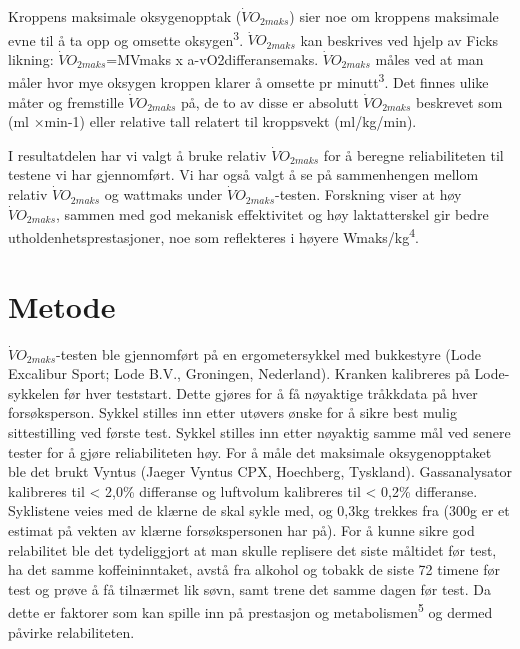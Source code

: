 \documentclass[
  letterpaper,
  DIV=11,
  numbers=noendperiod]{scrreprt}
\begin{document}
Kroppens maksimale oksygenopptak (\(\dot{V}O_{2maks}\)) sier noe om
kroppens maksimale evne til å ta opp og omsette
oksygen\textsuperscript{3}. \(\dot{V}O_{2maks}\) kan beskrives ved hjelp
av Ficks likning: \(\dot{V}O_{2maks}\)=MVmaks x a-vO2differansemaks.
\(\dot{V}O_{2maks}\) måles ved at man måler hvor mye oksygen kroppen
klarer å omsette pr minutt\textsuperscript{3}. Det finnes ulike måter og
fremstille \(\dot{V}O_{2maks}\) på, de to av disse er absolutt
\(\dot{V}O_{2maks}\) beskrevet som (ml ×min-1) eller relative tall
relatert til kroppsvekt (ml/kg/min).

I resultatdelen har vi valgt å bruke relativ \(\dot{V}O_{2maks}\) for å
beregne reliabiliteten til testene vi har gjennomført. Vi har også valgt
å se på sammenhengen mellom relativ \(\dot{V}O_{2maks}\) og wattmaks
under \(\dot{V}O_{2maks}\)-testen. Forskning viser at høy
\(\dot{V}O_{2maks}\), sammen med god mekanisk effektivitet og høy
laktatterskel gir bedre utholdenhetsprestasjoner, noe som reflekteres i
høyere Wmaks/kg\textsuperscript{4}.

\section{Metode}\label{metode}

\(\dot{V}O_{2maks}\)-testen ble gjennomført på en ergometersykkel med
bukkestyre (Lode Excalibur Sport; Lode B.V., Groningen, Nederland).
Kranken kalibreres på Lode-sykkelen før hver teststart. Dette gjøres for
å få nøyaktige tråkkdata på hver forsøksperson. Sykkel stilles inn etter
utøvers ønske for å sikre best mulig sittestilling ved første test.
Sykkel stilles inn etter nøyaktig samme mål ved senere tester for å
gjøre reliabiliteten høy. For å måle det maksimale oksygenopptaket ble
det brukt Vyntus (Jaeger Vyntus CPX, Hoechberg, Tyskland).
Gassanalysator kalibreres til \textless{} 2,0\% differanse og luftvolum
kalibreres til \textless{} 0,2\% differanse. Syklistene veies med de
klærne de skal sykle med, og 0,3kg trekkes fra (300g er et estimat på
vekten av klærne forsøkspersonen har på). For å kunne sikre god
relabilitet ble det tydeliggjort at man skulle replisere det siste
måltidet før test, ha det samme koffeininntaket, avstå fra alkohol og
tobakk de siste 72 timene før test og prøve å få tilnærmet lik søvn,
samt trene det samme dagen før test. Da dette er faktorer som kan spille
inn på prestasjon og metabolismen\textsuperscript{5} og dermed påvirke
relabiliteten.
\end{document}
